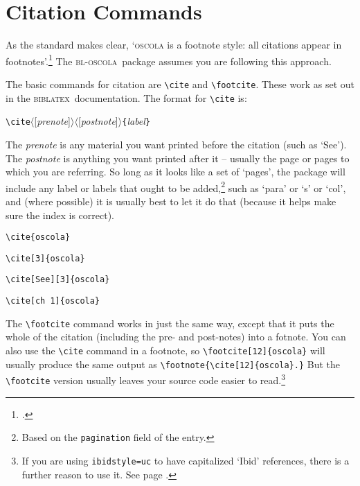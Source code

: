 \documentclass[a4paper,
               11pt,
	       DIV=1,			   
	       footinclude=false]
	      {scrartcl}
\newcommand{\oscola}{\textsc{bl-oscola}}
\newcommand{\biblatex}{\textsc{biblatex}}
\newcommand{\egcite}[1]{{\texttt{\textbackslash cite#1}}}
\begin{document}
\section{Citation Commands}

As the standard makes clear, `\textsc{oscola} is a footnote style: all
citations appear in footnotes'.\footcite[3]{oscola} The \oscola\
package assumes you are following this approach.

The basic commands for citation are \verb|\cite| and
\verb|\footcite|. These work as set out in the \biblatex\
documentation.
\index[general]{cite@\texttt{\textbackslash cite}}
The format for \verb|\cite| is:
\begin{center}
\verb|\cite|$\langle$[\emph{prenote}]$\rangle \langle$[\emph{postnote}]$\rangle$\verb|{|\emph{label}\verb|}|
\end{center}
The \emph{prenote} is any material you want printed before the
citation (such as `See').
The \emph{postnote} is anything you want
printed after it -- usually the page or pages to which you are
referring. So long as it looks like a set of `pages', the package will
include any label or labels that ought to be added,\footnote{Based on the \texttt{pagination} field of the entry.} such as `para' or
`s' or `col', and (where possible) it is usually best to let it do
that (because it helps make sure the index is correct).

\begin{description}
\item[\egcite{\{oscola\}}]          \cite{oscola}
\item[\egcite{[3]\{oscola\}}]       \cite[3]{oscola} 
\item[\egcite{[See][3]\{oscola\}}]  \cite[See][3]{oscola}
\item[\egcite{[ch~1]\{oscola\}}]    \cite[ch~1]{oscola}
\end{description}

The \verb|\footcite| command works in just the same way, except that
it puts the whole of the citation (including the pre- and post-notes)
into a fotnote.
\index[general]{footcite@\texttt{\textbackslash footcite}}
You can also use the \verb|\cite| command in a
footnote, so \verb|\footcite[12]{oscola}| will usually produce the same output as
\verb|\footnote{\cite[12]{oscola}.}| But the \verb|\footcite| version usually leaves your source code easier to read.\footnote{If you are using \texttt{ibidstyle=uc} to have capitalized `Ibid' references, there is a further reason to use it. See page \pageref{ibidstyle}.}
\end{document}
